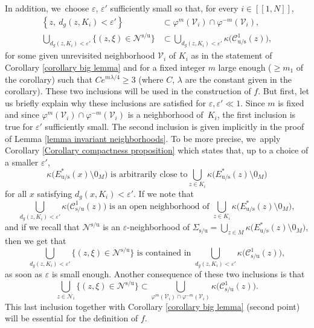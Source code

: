 \documentclass[11pt]{article}
\newcommand{\lcr}{[\![}
\newcommand{\rcr}{]\!]}
\newcommand{\rs}{\mathrm{s}}
\newcommand{\ru}{\mathrm{u}}
\theoremstyle{definition}
\theoremstyle{plain}
\newcommand{\Ccal}{\mathcal{C}}
\newcommand{\Ncal}{\mathcal{N}}
\newcommand{\Vcal}{\mathcal{V}}
\begin{document}
In addition, we~choose $\varepsilon$, $\varepsilon'$ sufficiently small so that, for every $i\in\lcr1,N\rcr$,
\begin{align*}
\left\{ z, \: d_g (z,K_i) < \varepsilon' \right\} &\subset \varphi^m (\Vcal_i) \cap \varphi^{-m} (\Vcal_i), \\
\bigcup_{d_g (z,K_i) < \varepsilon'} \bigl\{ (z,\xi) \in \Ncal^{\rs/\ru} \bigr\} &\subset \bigcup_{d_g (z,K_i) < \varepsilon'} \kappa \bigl(\Ccal_{\ru/\rs}^1 (z) \bigr),
\end{align*}
for some given unrevisited neighborhood $\Vcal_i$ of $K_i$ as in the statement of Corollary \ref{corollary big lemma} and for a fixed integer $m$ large enough ($\geq m_1$ of the corollary) such that $C e^{m\lambda/4} \geq 3$ (where $C$, $\lambda$ are the constant given in the corollary). These two inclusions will be used in the construction of $f$. But first, let us briefly explain why these inclusions are satisfied for $\varepsilon, \varepsilon' \ll 1$. Since $m$ is fixed and since $\varphi^m (\Vcal_i) \cap \varphi^{-m} (\Vcal_i)$ is a neighborhood of~$K_i$, the first inclusion is true for $\varepsilon'$ sufficiently small. The second inclusion is given implicitly in the proof of Lemma \ref{lemma invariant neighborhoods}. To be more precise, we~apply Corollary \ref{Corollary compactness proposition} which states that, up to a choice of a smaller $\varepsilon'$,
\[
\kappa \bigl(E_{\ru/\rs}^* (x) \setminus 0_M \bigr) \text{ is arbitrarily close to} \bigcup_{z \in K_i} \kappa \bigl(E_{\ru/\rs}^* (z) \setminus 0_M \bigr)
\]
for all $x$ satisfying $d_g (x,K_i) < \varepsilon'$. If we note that
\[
\bigcup_{d_g (z,K_i) < \varepsilon'} \kappa \bigl(\Ccal_{\rs/\ru}^1 (z) \bigr) \text{ is an open neighborhood of } \bigcup_{z \in K_i} \kappa \bigl(E_{\ru/\rs}^* (z) \setminus 0_M \bigr),
\]
and if we recall that $\Ncal^{\rs/\ru}$ is an $\varepsilon$-neighborhood of $\Sigma_{\rs/\ru} = \bigcup_{z \in M} \kappa \bigl(E_{\ru/\rs}^* (z) \setminus 0_M \bigr)$, then we get that
\[
\bigcup_{ d_g (z,K_i) < \varepsilon'}\bigl\{ (z,\xi) \in \Ncal^{\rs/\ru} \bigr\} \text{ is contained in } \bigcup_{d_g (z,K_i) < \varepsilon'} \kappa \bigl(\Ccal_{\rs/\ru}^1 (z) \bigr),
\]
as soon as $\varepsilon$ is small enough. Another consequence of these two inclusions is that
\begin{equation}\label{eq: proof escape function - inclusion of neighborhoods}
\bigcup_{z \in \Ncal_i} \bigl\{ (z,\xi) \in \Ncal^{\rs/\ru} \bigr\} \subset \bigcup_{\varphi^m (\Vcal_i) \cap \varphi^{-m} (\Vcal_i)} \kappa \bigl(\Ccal_{\rs/\ru}^1 (z) \bigr).
\end{equation}
This last inclusion together with Corollary \ref{corollary big lemma} (second point) will be essential for the definition of $f$.
\end{document}
